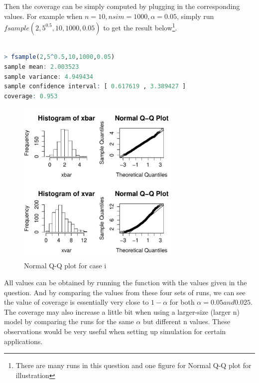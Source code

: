 \documentclass[10pt, letterpaper]{proc}
\begin{document}
Then the coverage can be simply computed by plugging in the corresponding values. For example when $n = 10, nsim = 1000, α = 0.05$, simply run $ fsample(2,5^{0.5},10,1000,0.05)$ to get the result below\footnote{There are many runs in this question and one figure for Normal Q-Q plot for illustration}.

\begin{lstlisting}[language=R, breaklines=T, basicstyle=\footnotesize\ttfamily]

> fsample(2,5^0.5,10,1000,0.05)
sample mean: 2.003523 
sample variance: 4.949434 
sample confidence interval: [ 0.617619 , 3.389427 ] 
coverage: 0.953 

\end{lstlisting}

\begin{figure}
	\centering \includegraphics[width=8cm]{simulation}
	\caption{Normal Q-Q plot for case i}
\end{figure}

 All values can be obtained by running the function with the values given in the question. And by comparing the values from these four sets of runs, we can see the value of coverage is essentially very close to $1-\alpha$ for both $\alpha = 0.05 and 0.025$. The coverage may also increase a little bit when using a larger-size (larger n) model by comparing the runs for the same $\alpha$ but different n values. These observations would be very useful when setting up simulation for certain applications.
 
\end{document}
